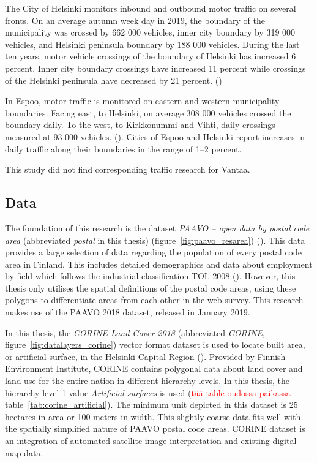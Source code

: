 The City of Helsinki monitors inbound and outbound motor traffic on several fronts. On an average autumn week day in 2019, the boundary of the municipality was crossed by 662 000 vehicles, inner city boundary by 319 000 vehicles, and Helsinki peninsula boundary by 188 000 vehicles. During the last ten years, motor vehicle crossings of the boundary of Helsinki has increased 6 percent. Inner city boundary crossings have increased 11 percent while crossings of the Helsinki peninsula have decreased by 21 percent. (\cite{CityofHelsinki2019})

In Espoo, motor traffic is monitored on eastern and western municipality boundaries. Facing east, to Helsinki, on average 308 000 vehicles crossed the boundary daily. To the west, to Kirkkonummi and Vihti, daily crossings measured at 93 000 vehicles. (\cite{Espoonkaup2020}). Cities of Espoo and Helsinki report increases in daily traffic along their boundaries in the range of 1--2 percent.

This study did not find corresponding traffic research for Vantaa.

\newpage
\subsection{Data}
\justify

The foundation of this research is the dataset \textit{PAAVO -- open data by postal code area} (abbreviated \textit{postal} in this thesis) (figure~\ref{fig:paavo_resarea}) (\cite{StatisticsFinland2019a}). This data provides a large selection of data regarding the population of every postal code area in Finland. This includes detailed demographics and data about employment by field which follows the industrial classification TOL 2008 (\cite{Tilastokeskus2008}). However, this thesis only utilises the spatial definitions of the postal code areas, using these polygons to differentiate areas from each other in the web survey. This research makes use of the PAAVO 2018 dataset, released in January 2019.

In this thesis, the \textit{CORINE Land Cover 2018} (abbreviated \textit{CORINE}, figure~\ref{fig:datalayers_corine}) vector format dataset is used to locate built area, or artificial surface, in the Helsinki Capital Region (\cite{FinnishEnvironmentInstitute2018}). Provided by Finnish Environment Institute, CORINE contains polygonal data about land cover and land use for the entire nation in different hierarchy levels. In this thesis, the hierarchy level 1 value \textit{Artificial surfaces} is used (\textcolor{red}{tää table oudossa paikassa}  table~\ref{tab:corine_artificial}). The minimum unit depicted in this dataset is 25 hectares in area or 100 meters in width. This slightly coarse data fits well with the spatially simplified nature of PAAVO postal code areas. CORINE dataset is an integration of automated satellite image interpretation and existing digital map data.

